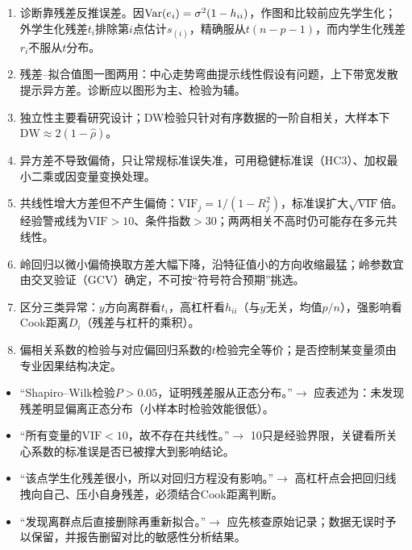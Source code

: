 \begin{fuxi}
\begin{enumerate}
\item 诊断靠残差反推误差。因$\operatorname{Var}(e_i)=\sigma^2(1-h_{ii})$，作图和比较前应先学生化；外学生化残差$t_i$排除第$i$点估计$s_{(i)}$，精确服从$t(n-p-1)$，而内学生化残差$r_i$不服从$t$分布。
\item 残差--拟合值图一图两用：中心走势弯曲提示线性假设有问题，上下带宽发散提示异方差。诊断应以图形为主、检验为辅。
\item 独立性主要看研究设计；DW检验只针对有序数据的一阶自相关，大样本下$\mathrm{DW}\approx 2(1-\widehat\rho)$。
\item 异方差不导致偏倚，只让常规标准误失准，可用稳健标准误（HC3）、加权最小二乘或因变量变换处理。
\item 共线性增大方差但不产生偏倚：$\mathrm{VIF}_j=1/(1-R_j^2)$，标准误扩大$\sqrt{\mathrm{VIF}}$倍。经验警戒线为$\mathrm{VIF}>10$、条件指数$>30$；两两相关不高时仍可能存在多元共线性。
\item 岭回归以微小偏倚换取方差大幅下降，沿特征值小的方向收缩最猛；岭参数宜由交叉验证（GCV）确定，不可按“符号符合预期”挑选。
\item 区分三类异常：$y$方向离群看$t_i$，高杠杆看$h_{ii}$（与$y$无关，均值$p/n$），强影响看Cook距离$D_i$（残差与杠杆的乘积）。
\item 偏相关系数的检验与对应偏回归系数的$t$检验完全等价；是否控制某变量须由专业因果结构决定。
\end{enumerate}
\end{fuxi}

\begin{fuxi}[常见错误表述]
\begin{itemize}
\item “Shapiro--Wilk检验$P>0.05$，证明残差服从正态分布。”$\longrightarrow$ 应表述为：未发现残差明显偏离正态分布（小样本时检验效能很低）。
\item “所有变量的$\mathrm{VIF}<10$，故不存在共线性。”$\longrightarrow$ 10只是经验界限，关键看所关心系数的标准误是否已被撑大到影响结论。
\item “该点学生化残差很小，所以对回归方程没有影响。”$\longrightarrow$ 高杠杆点会把回归线拽向自己、压小自身残差，必须结合Cook距离判断。
\item “发现离群点后直接删除再重新拟合。”$\longrightarrow$ 应先核查原始记录；数据无误时予以保留，并报告删留对比的敏感性分析结果。
\end{itemize}
\end{fuxi}
